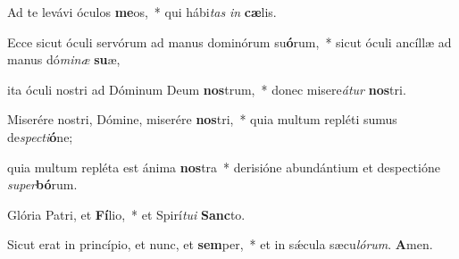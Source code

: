 \item Ad te levávi óculos \textbf{me}os,~* qui hábi\textit{tas} \textit{in} \textbf{cæ}lis.

\item Ecce sicut óculi servórum ad manus dominórum su\textbf{ó}rum,~* sicut óculi ancíllæ ad manus dó\textit{minæ} \textbf{su}æ,

\item ita óculi nostri ad Dóminum Deum \textbf{nos}trum,~* donec misere\textit{átur} \textbf{nos}tri.

\item Miserére nostri, Dómine, miserére \textbf{nos}tri,~* quia multum repléti sumus de\textit{specti}\textbf{ó}ne;

\item quia multum repléta est ánima \textbf{nos}tra~* derisióne abundántium et despectióne \textit{super}\textbf{bó}rum.

\item Glória Patri, et \textbf{Fí}lio,~* et Spirí\textit{tui} \textbf{Sanc}to.

\item Sicut erat in princípio, et nunc, et \textbf{sem}per,~* et in sǽcula sæcu\textit{lórum}. \textbf{A}men.